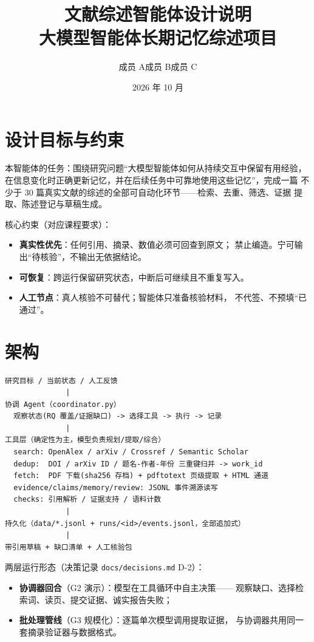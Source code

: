 \documentclass[UTF8, a4paper, zihao=-4]{ctexart}
\title{\textbf{文献综述智能体设计说明}\\{\large 大模型智能体长期记忆综述项目}}
\author{成员 A\quad 成员 B\quad 成员 C}  %
\date{2026 年 10 月}
\begin{document}
\maketitle

\section{设计目标与约束}

本智能体的任务：围绕研究问题``大模型智能体如何从持续交互中保留有用经验，
在信息变化时正确更新记忆，并在后续任务中可靠地使用这些记忆''，完成一篇
不少于 30 篇真实文献的综述的全部可自动化环节——检索、去重、筛选、证据
提取、陈述登记与草稿生成。

核心约束（对应课程要求）：
\begin{itemize}
  \item \textbf{真实性优先}：任何引用、摘录、数值必须可回查到原文；
        禁止编造。宁可输出``待核验''，不输出无依据结论。
  \item \textbf{可恢复}：跨运行保留研究状态，中断后可继续且不重复写入。
  \item \textbf{人工节点}：真人核验不可替代；智能体只准备核验材料，
        不代签、不预填``已通过''。
\end{itemize}

\section{架构}

\begin{lstlisting}
研究目标 / 当前状态 / 人工反馈
              |
协调 Agent（coordinator.py）
  观察状态(RQ 覆盖/证据缺口) -> 选择工具 -> 执行 -> 记录
              |
工具层（确定性为主，模型负责规划/提取/综合）
  search: OpenAlex / arXiv / Crossref / Semantic Scholar
  dedup:  DOI / arXiv ID / 题名-作者-年份 三重键归并 -> work_id
  fetch:  PDF 下载(sha256 存档) + pdftotext 页级提取 + HTML 通道
  evidence/claims/memory/review: JSONL 事件溯源读写
  checks: 引用解析 / 证据支持 / 语料计数
              |
持久化（data/*.jsonl + runs/<id>/events.jsonl，全部追加式）
              |
带引用草稿 + 缺口清单 + 人工核验包
\end{lstlisting}

两层运行形态（决策记录 \texttt{docs/decisions.md} D-2）：
\begin{itemize}
  \item \textbf{协调器回合}（G2 演示）：模型在工具循环中自主决策——
        观察缺口、选择检索词、读页、提交证据、诚实报告失败；
  \item \textbf{批处理管线}（G3 规模化）：逐篇单次模型调用提取证据，
        与协调器共用同一套摘录验证器与数据格式。
\end{itemize}
\end{document}
